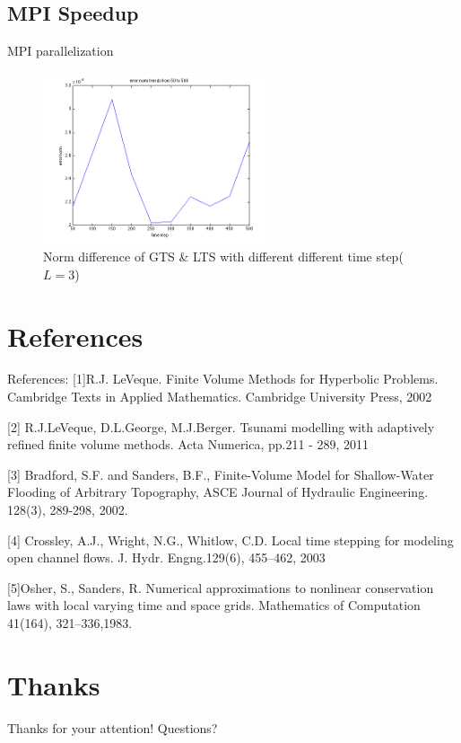 \documentclass{beamer}
\begin{document}
\subsection{MPI Speedup}
\begin{frame}{MPI parallelization}
\begin{figure}[p]
    \centering
    \includegraphics[width=0.6\textwidth]{2d_lts_error}
    \caption{Norm difference of GTS \& LTS with different different time step($L=3$)}
    \label{fig:awesome_image}
\end{figure}
\end{frame}

\section[]{References}

\begin{frame}[t]{References:}
[1]R.J. LeVeque. Finite Volume Methods for Hyperbolic Problems. Cambridge Texts in Applied Mathematics. Cambridge University Press, 2002
    
[2] R.J.LeVeque, D.L.George, M.J.Berger. Tsunami modelling with adaptively refined finite volume methods. Acta Numerica, pp.211 - 289, 2011

[3] Bradford, S.F. and Sanders, B.F., Finite-Volume Model for Shallow-Water Flooding of Arbitrary Topography, ASCE Journal of Hydraulic Engineering. 128(3), 289-298, 2002.

[4] Crossley, A.J., Wright, N.G., Whitlow, C.D. Local time stepping for modeling open channel flows. J. Hydr. Engng.129(6), 455–462, 2003

[5]Osher, S., Sanders, R. Numerical approximations to nonlinear conservation laws with local varying time and space grids. Mathematics of Computation 41(164), 321–336,1983.
\end{frame}

\section*{Thanks}

\begin{frame}[t]{Thanks for your attention! Questions?}

\end{frame}
\end{document}
